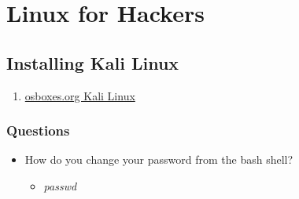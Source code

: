 \documentclass[12pt,letterpaper]{article}
\begin{document}
\section{Linux for Hackers}
\subsection{Installing Kali Linux} 
\begin{enumerate}
    \item \href{https://www.osboxes.org/kali-linux/}{osboxes.org Kali Linux}
\end{enumerate}
\subsubsection{Questions}
\begin{itemize}
    \item How do you change your password from the bash shell? 
    \begin{itemize}
        \item \textit{passwd}
    \end{itemize}
\end{itemize}
\end{document}
